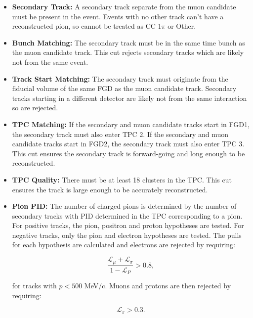 \begin{itemize}

\item \textbf{Secondary Track:} A secondary track separate from the muon candidate must be present in the event. Events with no other track can't have a reconstructed pion, so cannot be treated as CC 1$\pi$ or Other.

\item \textbf{Bunch Matching:} The secondary track must be in the same time bunch as the muon candidate track. This cut rejects secondary tracks which are likely not from the same event.

\item \textbf{Track Start Matching:} The secondary track must originate from the fiducial volume of the same FGD as the muon candidate track. Secondary tracks starting in a different detector are likely not from the same interaction so are rejected.

\item \textbf{TPC Matching:} If the secondary and muon candidate tracks start in FGD1, the secondary track must also enter TPC 2. If the secondary and muon candidate tracks start in FGD2, the secondary track must also enter TPC 3. This cut ensures the secondary track is forward-going and long enough to be reconstructed.

\item \textbf{TPC Quality:} There must be at least 18 clusters in the TPC. This cut ensures the track is large enough to be accurately reconstructed.

\item \textbf{Pion PID:} The number of charged pions is determined by the number of secondary tracks with PID determined in the TPC corresponding to a pion. For positive tracks, the pion, positron and proton hypotheses are tested. For negative tracks, only the pion and electron hypotheses are tested. The pulls for each hypothesis are calculated and electrons are rejected by requiring:

\begin{equation}
\frac{\mathcal{L}_{\mu}+\mathcal{L}_{\pi}}{1-\mathcal{L}_P} > 0.8,
\end{equation}

for tracks with $p < 500$ MeV/c. Muons and protons are then rejected by requiring:

\begin{equation}
\mathcal{L}_{\pi} > 0.3.
\end{equation}


\end{itemize}
